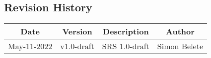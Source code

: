 


\begin{center}
\section*{Revision History}
\end{center}


\doublespacing
\vspace{1.0cm}
\noindent

\begin{center}
\begin{tabular}{ |c|c|c|c| } 
 \hline
 \textbf{Date} & \textbf{Version} & \textbf{Description} & \textbf{Author} \\ 
 \hline
 May-11-2022 & v1.0-draft & SRS 1.0-draft & Simon Belete \\
 \hline
\end{tabular}
\end{center}